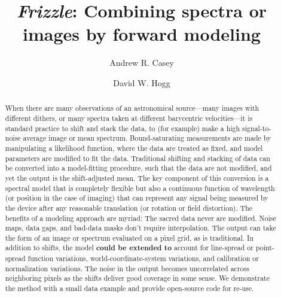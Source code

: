 \documentclass[modern, linenumbers]{aastex631}
\newcommand{\name}{\textsl{Frizzle}}
\newcommand{\modified}[1]{\textcolor{Emerald}{\textbf{#1}}}
\begin{document}
\title{\large \name: Combining spectra or images by forward modeling}

\author[0000-0003-0174-0564]{Andrew R. Casey}


\author[0000-0003-2866-9403]{David W. Hogg}


\begin{abstract}\noindent
When there are many observations of an astronomical source---many images with different dithers, or many spectra taken at different barycentric velocities---it is standard practice to shift and stack the data, to (for example) make a high signal-to-noise average image or mean spectrum.
Bound-saturating measurements are made by manipulating a likelihood function, where the data are treated as fixed, and model parameters are modified to fit the data.
Traditional shifting and stacking of data can be converted into a model-fitting procedure, such that the data are not modified, and yet the output is the shift-adjusted mean.
The key component of this conversion is a spectral model that is completely flexible but also a continuous function of wavelength (or position in the case of imaging) that can represent any signal being measured by the device after any reasonable translation (or rotation or field distortion).
The benefits of a modeling approach are myriad:
The sacred data never are modified.
Noise maps, data gaps, and bad-data masks don't require interpolation.
The output can take the form of an image or spectrum evaluated on a pixel grid, as is traditional.
In addition to shifts, the model \modified{could be extended to} account for line-spread or point-spread function variations, world-coordinate-system variations, and calibration or normalization variations.
The noise in the output becomes uncorrelated across neighboring pixels as the shifts deliver good coverage in some sense.
We demonstrate the method with a small data example and provide open-source code for re-use.
\end{abstract}
\end{document}
